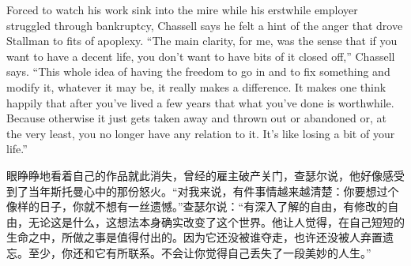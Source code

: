 \ifdefined\eng
Forced to watch his work sink into the mire while his erstwhile employer struggled through bankruptcy, Chassell says he felt a hint of the anger that drove Stallman to fits of apoplexy. ``The main clarity, for me, was the sense that if you want to have a decent life, you don't want to have bits of it closed off,'' Chassell says. ``This whole idea of having the freedom to go in and to fix something and modify it, whatever it may be, it really makes a difference. It makes one think happily that after you've lived a few years that what you've done is worthwhile. Because otherwise it just gets taken away and thrown out or abandoned or, at the very least, you no longer have any relation to it. It's like losing a bit of your life.''
\fi

\ifdefined\chs
眼睁睁地看着自己的作品就此消失，曾经的雇主破产关门，查瑟尔说，他好像感受到了当年斯托曼心中的那份怒火。``对我来说，有件事情越来越清楚：你要想过个像样的日子，你就不想有一丝遗憾。''查瑟尔说：``有深入了解的自由，有修改的自由，无论这是什么，这想法本身确实改变了这个世界。他让人觉得，在自己短短的生命之中，所做之事是值得付出的。因为它还没被谁夺走，也许还没被人弃置遗忘。至少，你还和它有所联系。不会让你觉得自己丢失了一段美妙的人生。''
\fi

\bigskip

\theendnotes
\setcounter{endnote}{0}
